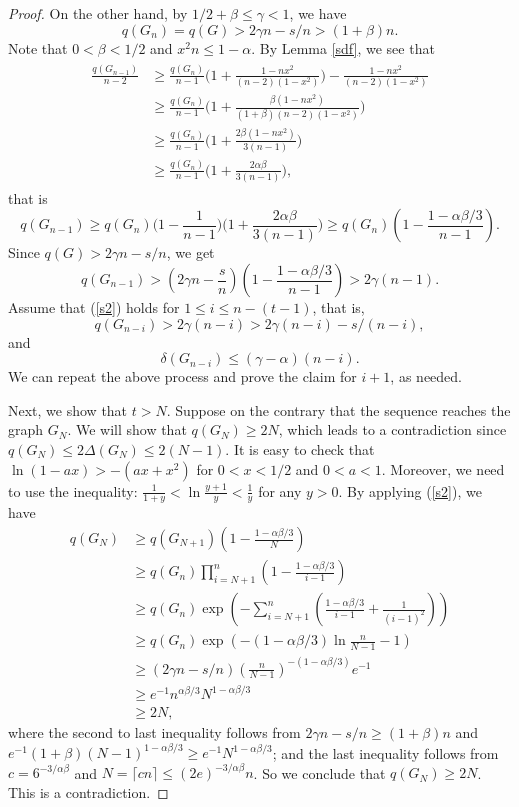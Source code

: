 \documentclass[11pt,a4paper]{article}
\theoremstyle{plain}
\theoremstyle{definition}
\begin{document}
\begin{proof}
On the other hand, by $1/2+\beta\leq\gamma<1$, we have
$$q(G_{n})=q(G)>2\gamma n-s/n>(1+\beta)n.$$
Note that $0<\beta<1/2$ and $x^{2}n\leq  1-\alpha$. 
By Lemma \ref{sdf}, we see that
\begin{align*}
\begin{split}
\frac{q(G_{n-1})}{n-2}&\geq \frac{q(G_{n})}{n-1}\bigg(1+\frac{1-nx^{2}}{(n-2)(1-x^{2})}\bigg)-\frac{1-nx^{2}}{(n-2)(1-x^{2})}\\
&\geq \frac{q(G_{n})}{n-1}\bigg(1+\frac{\beta(1-nx^{2})}{(1+\beta)(n-2)(1-x^{2})}\bigg)\\
&\geq \frac{q(G_{n})}{n-1}\bigg(1+\frac{2\beta(1-nx^{2})}{3(n-1)}\bigg)\\
&\geq \frac{q(G_{n})}{n-1}\bigg(1+\frac{2\alpha\beta}{3(n-1)}\bigg),
\end{split}
\end{align*}
that is
$$q(G_{n-1})\geq q(G_{n})\bigg(1-\frac{1}{n-1}\bigg)\bigg(1+\frac{2\alpha\beta}{3(n-1)}\bigg)\geq
q(G_{n})\left( 
1- \frac{1-\alpha\beta/3}{n-1} \right).$$
Since $q(G)>2\gamma n-s/n$, we get 
$$q(G_{n-1})> \left(2\gamma n- \frac{s}{n} \right)
\left(1- \frac{1-\alpha\beta/3}{n-1} \right)>2\gamma (n-1).$$
Assume that  (\ref{s2}) holds for $1\leq i\leq n-(t-1)$, that is, 
$$q(G_{n-i})>2\gamma (n-i)>2\gamma (n-i)-s/(n-i),$$
and $$\delta(G_{n-i})\leq(\gamma-\alpha)(n-i).$$
We can repeat the above process and prove the claim for $i+1$, as needed. 


 Next, we show that $t>N$. Suppose on the contrary that the sequence reaches the graph $G_{N}$.  
 We will show that $q(G_N)\ge 2N$, which leads to a contradiction since $q(G_N)\le 2\Delta (G_N)\le 2(N-1)$.   
 It is easy to check that 
 $\ln (1-ax) >- (ax +x^2)$ for $0<x< 1/2$ and $0<a<1$. Moreover, we need to use the inequality: $\frac{1}{1+y}< \ln \frac{y+1}{y} < \frac{1}{y}$ for any $y>0$.  
 By applying (\ref{s2}), we have
\begin{displaymath}
\begin{split}
q(G_{N})
&\geq q(G_{N+1})\left( 
1- \frac{1-\alpha\beta/3}{N} \right)\\
&\geq q(G_{n})\prod_{i=N+1}^{n}\left(1- 
\frac{1-\alpha \beta/3}{i-1} \right)\\
&\geq q(G_{n}) 
\exp\left(-\sum_{i=N+1}^{n}
\left( \frac{1-\alpha \beta/3}{i-1} + 
\frac{1}{(i-1)^{2}} \right)\right)\\ 
&\geq q(G_{n})\exp\left(-(1-\alpha\beta/3) \ln \frac{n}{N-1}-1\right)\\
&\geq (2\gamma n-s/n)\left(\frac{n}{N-1}\right)^{-(1-\alpha\beta/3)}e^{-1}\\
&\geq e^{-1}n^{\alpha\beta/3}N^{1-\alpha\beta/3}\\  
&\geq 2N,
\end{split}
\end{displaymath}
where the second to last inequality follows from
$2\gamma n-s/n\geq(1+\beta) n$ and $e^{-1}(1+\beta)(N-1)^{1-\alpha\beta/3}\geq e^{-1}N^{1-\alpha\beta/3}$; and the last inequality follows from $c=6^{-3/\alpha\beta}$ and $N=\lceil c n\rceil\leq (2e)^{-3/\alpha\beta}n$. 
So we conclude that $q(G_N)\ge 2N$. 
This is a contradiction. 


\end{proof}
\end{document}
